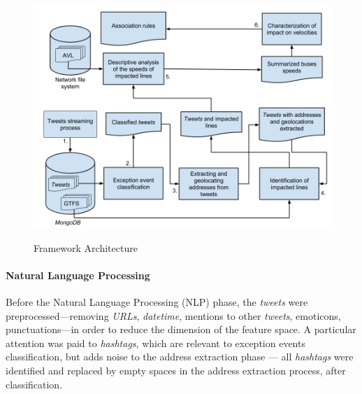 \documentclass[runningheads]{llncs}
\begin{document}
\begin{figure}[!htb]
	\centering
 	  \caption{Framework Architecture}
		\includegraphics[width=0.7\linewidth]{caracterization_flow_en.png}
	\label{fig:caracterization_flow_en}
\end{figure}

\paragraph{\textbf{Natural Language Processing}}
\label{nlp}

Before the Natural Language Processing (NLP) phase, the \textit{tweets} were preprocessed---removing \textit{URLs}, \textit{datetime}, mentions to other \textit{tweets}, emoticons, punctuations---in order to reduce the dimension of the feature space. A particular attention was paid to \textit{hashtags}, which are relevant to exception events classification, but adds noise to the address extraction phase --- all \textit{hashtags} were identified and replaced by empty spaces in the address extraction process, after classification.
\end{document}
